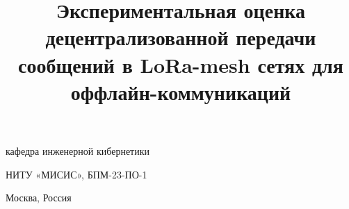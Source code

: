 
\title{Экспериментальная оценка децентрализованной передачи сообщений в LoRa-mesh сетях для оффлайн-коммуникаций}

  {кафедра инженерной кибернетики\par НИТУ «МИСИС», БПМ-23-ПО-1}
  {Москва, Россия}
  {}
